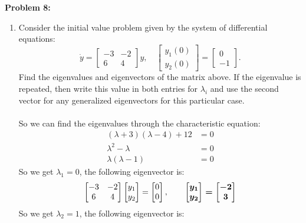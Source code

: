 \documentclass[12pt]{article}
\begin{document}
\noindent \textbf{Problem 8: }
	\begin{enumerate}[label = (\alph*)]
		\item Consider the initial value problem given by the system of differential equations:
			$$
			\dot{y}
			=
			\left\lbrack
			\begin{array}{rr}
			-3 & -2 \\
			6 & 4
			\end{array}
			\right\rbrack y, \quad
			\left\lbrack
			\begin{array}{r}
			y_1(0) \\
			y_2(0)
			\end{array}
			\right\rbrack
			=
			\left\lbrack
			\begin{array}{r}
			0 \\
			-1
			\end{array}
			\right\rbrack.
			$$
		Find the eigenvalues and eigenvectors of the matrix above. If the eigenvalue is repeated, then write this value in both entries for $\lambda_i$ and use the second vector for any generalized eigenvectors for this particular case.	
		\\ \\
		So we can find the eigenvalues through the characteristic equation:
			\begin{align*}
				(\lambda + 3)(\lambda - 4) + 12 &= 0 \\
				\lambda^2 - \lambda &= 0 \\
				\lambda(\lambda - 1) &= 0
			\end{align*}
		So we get \boldmath$\lambda_1 = 0$\unboldmath, the following eigenvector is:
			$$
			\begin{bmatrix}
				-3 & -2 \\
				6 & 4
			\end{bmatrix}
			\begin{bmatrix}
				y_1 \\ y_2
			\end{bmatrix} 
			= 
			\begin{bmatrix}
				0 \\ 0
			\end{bmatrix}
			, \qquad 
			\text{\boldmath $
			\begin{bmatrix}
				y_1 \\ y_2
			\end{bmatrix}
			=
			\begin{bmatrix}
				-2 \\ 3
			\end{bmatrix}$}
			$$
		So we get \boldmath$\lambda_2 = 1$\unboldmath, the following eigenvector is:

\end{enumerate}
\end{document}

